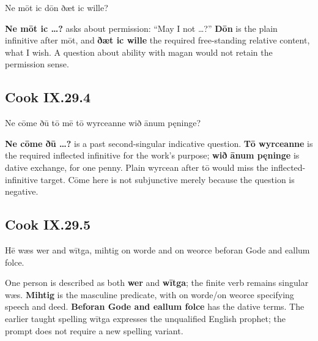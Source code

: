 \par\begin{minipage}{\linewidth}\raggedright
Ne mōt ic dōn ðæt ic wille?

\textbf{Ne mōt ic …?} asks about permission: “May I not …?” \textbf{Dōn} is the plain infinitive after mōt, and \textbf{ðæt ic wille} the required free-standing relative content, what I wish. A question about ability with magan would not retain the permission sense.

\end{minipage}\par\addvspace{4pt}

\subsection*{Cook IX.29.4}

\par\begin{minipage}{\linewidth}\raggedright
Ne cōme ðū tō mē tō wyrceanne wið ānum pęninge?

\textbf{Ne cōme ðū …?} is a past second-singular indicative question. \textbf{Tō wyrceanne} is the required inflected infinitive for the work’s purpose; \textbf{wið ānum pęninge} is dative exchange, for one penny. Plain wyrcean after tō would miss the inflected-infinitive target. Cōme here is not subjunctive merely because the question is negative.

\end{minipage}\par\addvspace{4pt}

\subsection*{Cook IX.29.5}

\par\begin{minipage}{\linewidth}\raggedright
Hē wæs wer and wītga, mihtig on worde and on weorce beforan Gode and eallum folce.

One person is described as both \textbf{wer} and \textbf{wītga}; the finite verb remains singular wæs. \textbf{Mihtig} is the masculine predicate, with on worde/\allowbreak{}on weorce specifying speech and deed. \textbf{Beforan Gode and eallum folce} has the dative terms. The earlier taught spelling wītga expresses the unqualified English prophet; the prompt does not require a new spelling variant.

\end{minipage}\par\addvspace{4pt}

